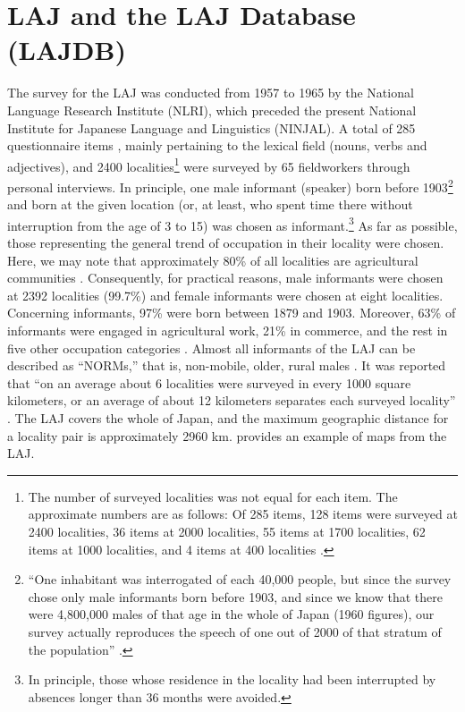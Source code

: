 \documentclass[output=paper]{LSP/langsci}
\begin{document}
\section{LAJ and the LAJ Database (LAJDB)}

The survey for the LAJ was conducted from 1957 to 1965 by the National Language Research Institute (NLRI), which preceded the present National Institute for Japanese Language and Linguistics (NINJAL). A total of 285 questionnaire items \citep[105--118]{kokuritsu_kokugo_kenkyujo_nlri_nihon_1966}, mainly pertaining to the lexical field (nouns, verbs and adjectives), and 2400 localities\footnote{The number of surveyed localities was not equal for each item. The approximate numbers are as follows: Of 285 items, 128 items were surveyed at 2400 localities, 36 items at 2000 localities, 55 items at 1700 localities, 62 items at 1000 localities, and 4 items at 400 localities \citep[22, 41]{kokuritsu_kokugo_kenkyujo_nlri_nihon_1966}.} were surveyed by 65 fieldworkers through personal interviews. In principle, one male informant (speaker) born before 1903\footnote{“One inhabitant was interrogated of each 40,000 people, but since the survey chose only male informants born before 1903, and since we know that there were 4,800,000 males of that age in the whole of Japan (1960 figures), our survey actually reproduces the speech of one out of 2000 of that stratum of the population” \citep[41--42]{kokuritsu_kokugo_kenkyujo_nlri_nihon_1966}.} and born at the given location (or, at least, who spent time there without interruption from the age of 3 to 15) was chosen as informant.\footnote{In principle, those whose residence in the locality had been interrupted by absences longer than 36 months were avoided.} As far as possible, those representing the general trend of occupation in their locality were chosen. Here, we may note that approximately 80\% of all localities are agricultural communities \citep[22, 42]{kokuritsu_kokugo_kenkyujo_nlri_nihon_1966}. Consequently, for practical reasons, male informants were chosen at 2392 localities (99.7\%) and female informants were chosen at eight localities. Concerning informants, 97\% were born between 1879 and 1903. Moreover, 63\% of informants were engaged in agricultural work, 21\% in commerce, and the rest in five other occupation categories \citep[24--26, 42, 43]{kokuritsu_kokugo_kenkyujo_nlri_nihon_1966}. Almost all informants of the LAJ can be described as “NORMs,” that is, non-mobile, older, rural males \citep[29]{chambers_dialectology_1998}. It was reported that “on an average about 6 localities were surveyed in every 1000 square kilometers, or an average of about 12 kilometers separates each surveyed locality” \citep[41]{kokuritsu_kokugo_kenkyujo_nlri_nihon_1966}. The LAJ covers the whole of Japan, and the maximum geographic distance for a locality pair is approximately 2960 km.  provides an example of maps from the LAJ.
\end{document}
